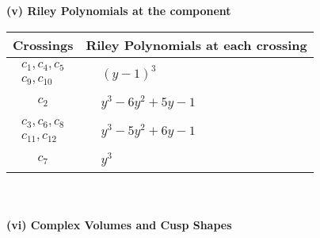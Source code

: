 \documentclass[1p]{elsarticle_modified}
\theoremstyle{definition}
\begin{document}
\newpage\renewcommand{\arraystretch}{1}
\flushleft \textbf{(v) Riley Polynomials at the component}\newline \\
\begin{tabular}{m{50pt}|m{274pt}}
Crossings & \hspace{64pt}Riley Polynomials at each crossing \\
\hline $$\begin{aligned}c_{1},c_{4},c_{5}\\c_{9},c_{10}\end{aligned}$$&$\begin{aligned}
&(y-1)^3
\end{aligned}$\\
\hline $$\begin{aligned}c_{2}\end{aligned}$$&$\begin{aligned}
&y^3-6 y^2+5 y-1
\end{aligned}$\\
\hline $$\begin{aligned}c_{3},c_{6},c_{8}\\c_{11},c_{12}\end{aligned}$$&$\begin{aligned}
&y^3-5 y^2+6 y-1
\end{aligned}$\\
\hline $$\begin{aligned}c_{7}\end{aligned}$$&$\begin{aligned}
&y^3
\end{aligned}$\\
\hline
\end{tabular}\\~\\
\newpage\flushleft \textbf{(vi) Complex Volumes and Cusp Shapes}
\end{document}
